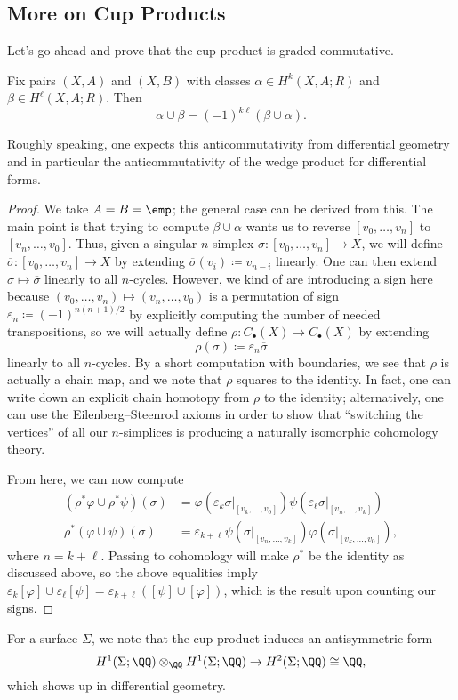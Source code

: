 \documentclass[../notes.tex]{subfiles}
\begin{document}
\subsection{More on Cup Products}
Let's go ahead and prove that the cup product is graded commutative.
\begin{proposition}
	Fix pairs $(X,A)$ and $(X,B)$ with classes $\alpha\in H^k(X,A;R)$ and $\beta\in H^\ell(X,A;R)$. Then
	\[\alpha\cup\beta=(-1)^{k\ell}(\beta\cup\alpha).\]
\end{proposition}
\begin{remark}
	Roughly speaking, one expects this anticommutativity from differential geometry and in particular the anticommutativity of the wedge product for differential forms.
\end{remark}
\begin{proof}
	We take $A=B=\emp$; the general case can be derived from this. The main point is that trying to compute $\beta\cup\alpha$ wants us to reverse $[v_0,\ldots,v_n]$ to $[v_n,\ldots,v_0]$. Thus, given a singular $n$-simplex $\sigma\colon[v_0,\ldots,v_n]\to X$, we will define $\overline\sigma\colon[v_0,\ldots,v_n]\to X$ by extending $\overline\sigma(v_i)\coloneqq v_{n-i}$ linearly. One can then extend $\sigma\mapsto\overline\sigma$ linearly to all $n$-cycles. However, we kind of are introducing a sign here because $(v_0,\ldots,v_n)\mapsto(v_n,\ldots,v_0)$ is a permutation of sign $\varepsilon_n\coloneqq(-1)^{n(n+1)/2}$ by explicitly computing the number of needed transpositions, so we will actually define $\rho\colon C_\bullet(X)\to C_\bullet(X)$ by extending
	\[\rho(\sigma)\coloneqq\varepsilon_n\overline\sigma\]
	linearly to all $n$-cycles. By a short computation with boundaries, we see that $\rho$ is actually a chain map, and we note that $\rho$ squares to the identity. In fact, one can write down an explicit chain homotopy from $\rho$ to the identity; alternatively, one can use the Eilenberg--Steenrod axioms in order to show that ``switching the vertices'' of all our $n$-simplices is producing a naturally isomorphic cohomology theory.

	From here, we can now compute
	\begin{align*}
		(\rho^*\varphi\cup\rho^*\psi)(\sigma) &= \varphi(\varepsilon_k\sigma|_{[v_k,\ldots,v_0]})\psi(\varepsilon_\ell\sigma|_{[v_n,\ldots,v_k]}) \\
		\rho^*(\varphi\cup\psi)(\sigma) &= \varepsilon_{k+\ell}\psi(\sigma|_{[v_n,\ldots,v_k]})\varphi(\sigma|_{[v_k,\ldots,v_0]}),
	\end{align*}
	where $n=k+\ell$. Passing to cohomology will make $\rho^*$ be the identity as discussed above, so the above equalities imply $\varepsilon_k[\varphi]\cup\varepsilon_\ell[\psi]=\varepsilon_{k+\ell}([\psi]\cup[\varphi])$, which is the result upon counting our signs.
\end{proof}
\begin{remark}
	For a surface $\Sigma$, we note that the cup product induces an antisymmetric form
	\[H^1(\Sigma;\QQ)\otimes_\QQ H^1(\Sigma;\QQ)\to H^2(\Sigma;\QQ)\cong\QQ,\]
	which shows up in differential geometry.
\end{remark}
\end{document}
